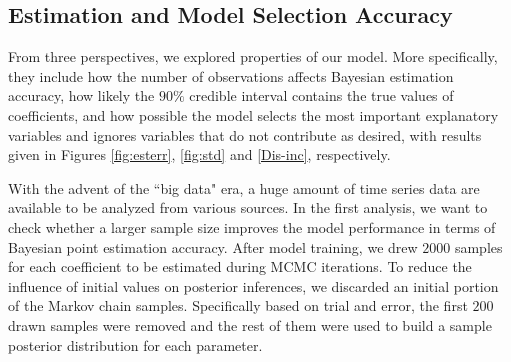 \documentclass[twoside,11pt]{article}
\begin{document}
\subsection{Estimation and Model Selection Accuracy}
From three perspectives, we explored properties of our model. More specifically, they include how the number of observations affects Bayesian estimation accuracy, how likely the $90\%$ credible interval contains the true values of coefficients, and how possible the model selects the most important explanatory variables and ignores variables that do not contribute as desired, with results given in Figures \ref{fig:esterr}, \ref{fig:std} and \ref{Dis-inc}, respectively.

With the advent of the ``big data" era, a huge amount of time series data are available to be analyzed from various sources. In the first analysis, we want to check whether a larger sample size improves the model performance in terms of Bayesian point estimation accuracy. After model training, we drew $2000$ samples for each coefficient to be estimated during MCMC iterations. 
To reduce the influence of initial values on posterior inferences, we discarded an initial portion of the Markov chain samples. Specifically based on trial and error, the first $200$ drawn samples were removed and the rest of them were used to build a sample posterior distribution for each parameter.
\end{document}
